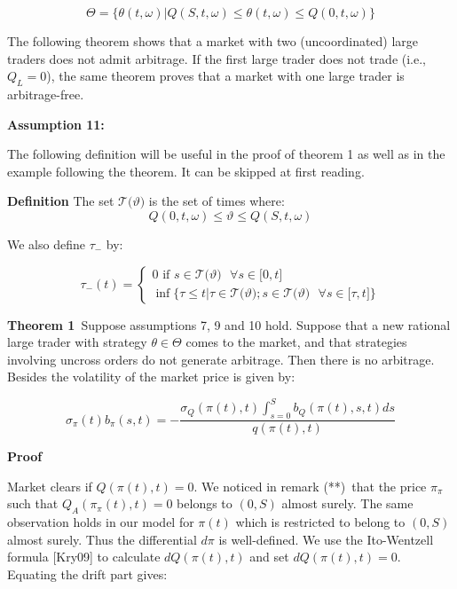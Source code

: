 \documentclass{article}
\begin{document}
\begin{equation*}
\Theta =\{\theta (t,\omega )|Q(S,t,\omega )\leq \theta (t,\omega )\leq
Q(0,t,\omega )\}
\end{equation*}

The following theorem shows that a market with two (uncoordinated) large
traders does not admit arbitrage. If the first large trader does not trade
(i.e., $Q_{L}=0$), the same theorem proves that a market with one large
trader is arbitrage-free.

\bigskip

\textbf{Assumption 11:}

\bigskip

The following definition will be useful in the proof of theorem 1 as well as
in the example following the theorem. It can be skipped at first reading.

\bigskip

\textbf{Definition} The set $\mathcal{T(}\vartheta )$ is the set of times
where:%
\begin{equation*}
Q(0,t,\omega )\leq \vartheta \leq Q(S,t,\omega )
\end{equation*}

We also define $\tau _{-}$ by:

\begin{equation*}
\tau _{-}(t)=\left\{
\begin{array}{c}
0\text{ if }s\in \mathcal{T(}\vartheta )\text{ }\forall s\in \lbrack 0,t]%
\text{ \ \ \ \ \ \ \ \ \ \ \ \ \ \ \ \ \ \ \ \ \ \ \ } \\
\inf \{\tau \leq t|\tau \in \mathcal{T(}\vartheta );s\in \mathcal{T(}%
\vartheta )\text{ }\forall s\in \lbrack \tau ,t]\}%
\end{array}%
\right.
\end{equation*}%
\bigskip

\textbf{Theorem 1}\ Suppose assumptions 7, 9 and 10 hold. Suppose that a new
rational large trader with strategy $\theta \in \Theta $ comes to the
market, and that strategies involving uncross orders do not generate
arbitrage. Then there is no arbitrage. Besides the volatility of the market
price is given by:

\begin{equation}
\sigma _{\pi }(t)b_{\pi }(s,t)=-\frac{\sigma _{Q}(\pi
(t),t)\int_{s=0}^{S}b_{Q}(\pi (t),s,t)ds}{q(\pi (t),t)}  \label{vovol}
\end{equation}

\textbf{Proof }

Market clears if $Q(\pi (t),t)=0$. We noticed in remark (**)\ that the price
$\pi _{\pi }$ such that $Q_{A}(\pi _{\pi }(t),t)=0$ belongs to $(0,S)$
almost surely. The same observation holds in our model for $\pi (t)$ which
is restricted to belong to $(0,S)$ almost surely. Thus the differential $%
d\pi $ is well-defined. We use the Ito-Wentzell formula [Kry09] to calculate
$dQ(\pi (t),t)$ and set $dQ(\pi (t),t)=0$. Equating the drift part gives:
\end{document}
